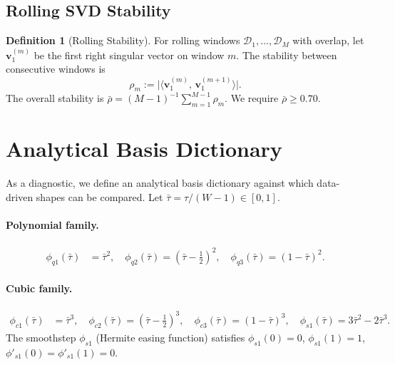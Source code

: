\documentclass[11pt,a4paper]{article}
\theoremstyle{definition}
\newtheorem{definition}{Definition}[section]
\theoremstyle{plain}
\newcommand{\bvec}[1]{\mathbf{#1}}
\newcommand{\inner}[2]{\langle #1,\, #2 \rangle}
\begin{document}
\subsection{Rolling SVD Stability}

\begin{definition}[Rolling Stability]
\label{def:rolling_stability}
For rolling windows $\mathcal{D}_1, \ldots, \mathcal{D}_M$ with overlap,
let $\bvec{v}^{(m)}_1$ be the first right singular vector on window $m$.
The stability between consecutive windows is
\begin{equation}
    \rho_m :=
    \bigl|\inner{\bvec{v}^{(m)}_1}{\bvec{v}^{(m+1)}_1}\bigr|.
    \label{eq:rolling_stability}
\end{equation}
The overall stability is $\bar{\rho} = (M-1)^{-1}\sum_{m=1}^{M-1} \rho_m$.
We require $\bar{\rho} \geq 0.70$.
\end{definition}

\section{Analytical Basis Dictionary}
\label{sec:basis}

As a diagnostic, we define an analytical basis dictionary against which
data-driven shapes can be compared. Let
$\bar{\tau} = \tau/(W-1) \in [0,1]$.

\paragraph{Polynomial family.}
\begin{align}
    \phi_{q1}(\bar{\tau}) &= \bar{\tau}^2, \quad
    \phi_{q2}(\bar{\tau}) = (\bar{\tau} - \tfrac{1}{2})^2, \quad
    \phi_{q3}(\bar{\tau}) = (1 - \bar{\tau})^2.
    \label{eq:poly_basis}
\end{align}

\paragraph{Cubic family.}
\begin{align}
    \phi_{c1}(\bar{\tau}) &= \bar{\tau}^3, \quad
    \phi_{c2}(\bar{\tau}) = (\bar{\tau} - \tfrac{1}{2})^3, \quad
    \phi_{c3}(\bar{\tau}) = (1 - \bar{\tau})^3, \quad
    \phi_{s1}(\bar{\tau}) = 3\bar{\tau}^2 - 2\bar{\tau}^3.
    \label{eq:cubic_basis}
\end{align}
The smoothstep $\phi_{s1}$ (Hermite easing function) satisfies
$\phi_{s1}(0)=0$, $\phi_{s1}(1)=1$, $\phi'_{s1}(0)=\phi'_{s1}(1)=0$.
\end{document}
